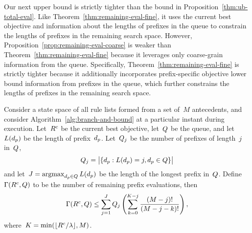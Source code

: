 \begin{arxiv}

Our next upper bound is strictly tighter than the bound in
Proposition~\ref{thm:ub-total-eval}.
%
Like Theorem~\ref{thm:remaining-eval-fine}, it uses the
current best objective and information about
the lengths of prefixes in the queue to constrain
the lengths of prefixes in the remaining search space.
%
However, Proposition~\ref{prop:remaining-eval-coarse}
is weaker than Theorem~\ref{thm:remaining-eval-fine} because
it leverages only coarse-grain information from the queue.
%
Specifically, Theorem~\ref{thm:remaining-eval-fine} is
strictly tighter because it additionally incorporates
prefix-specific objective lower bound information from
prefixes in the queue, which further constrains
the lengths of prefixes in the remaining search space.

\begin{proposition} \hfill
\label{prop:remaining-eval-coarse}
Consider a state space of all rule lists formed from a set of~$M$ antecedents,
and consider Algorithm~\ref{alg:branch-and-bound} at a particular instant
during execution.
%
Let~${R^c}$ be the current best objective, let~$Q$ be the queue,
and let~$L(d_p)$ be the length of prefix~$d_p$.
%
Let~$Q_j$ be the number of prefixes of length~$j$ in~$Q$,
\begin{align}
Q_j = \big | \{ d_p : L(d_p) = j, d_p \in Q \} \big |
\end{align}
and let~${J = \operatorname*{argmax}_{d_p \in Q} L(d_p)}$
be the length of the longest prefix in~$Q$.
%
Define~${\Gamma({R^c}, Q)}$ to be the number of remaining
prefix evaluations, then
\begin{align}
\Gamma({R^c}, Q)
\le \sum_{j=1}^J Q_j \left( \sum_{k=0}^{K-j} \frac{(M-j)!}{(M-j - k)!} \right),
\end{align}
where~${K = \min(\lfloor {R^c} / {\lambda} \rfloor, M)}$.
\end{proposition}


\end{arxiv}
